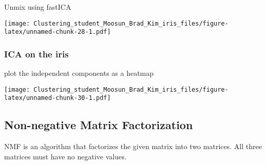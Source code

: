 \documentclass[11pt,]{article}
\newenvironment{Shaded}{\begin{snugshade}}{\end{snugshade}}
\newcommand{\DataTypeTok}[1]{\textcolor[rgb]{0.13,0.29,0.53}{#1}}
\newcommand{\DecValTok}[1]{\textcolor[rgb]{0.00,0.00,0.81}{#1}}
\newcommand{\KeywordTok}[1]{\textcolor[rgb]{0.13,0.29,0.53}{\textbf{#1}}}
\newcommand{\NormalTok}[1]{#1}
\newcommand{\OperatorTok}[1]{\textcolor[rgb]{0.81,0.36,0.00}{\textbf{#1}}}
\newcommand{\StringTok}[1]{\textcolor[rgb]{0.31,0.60,0.02}{#1}}
\begin{document}
Unmix using fastICA

\begin{Shaded}
\end{Shaded}

\texttt{[image: Clustering\_student\_Moosun\_Brad\_Kim\_iris\_files/figure-latex/unnamed-chunk-28-1.pdf]}

\hypertarget{ica-on-the-iris}{%
\subsubsection{ICA on the iris}\label{ica-on-the-iris}}

plot the independent components as a heatmap

\begin{Shaded}
\end{Shaded}

\texttt{[image: Clustering\_student\_Moosun\_Brad\_Kim\_iris\_files/figure-latex/unnamed-chunk-30-1.pdf]}

\newpage

\hypertarget{non-negative-matrix-factorization}{%
\subsection{Non-negative Matrix
Factorization}\label{non-negative-matrix-factorization}}

NMF is an algorithm that factorizes the given matrix into two matrices.
All three matrices must have no negative values.
\end{document}
